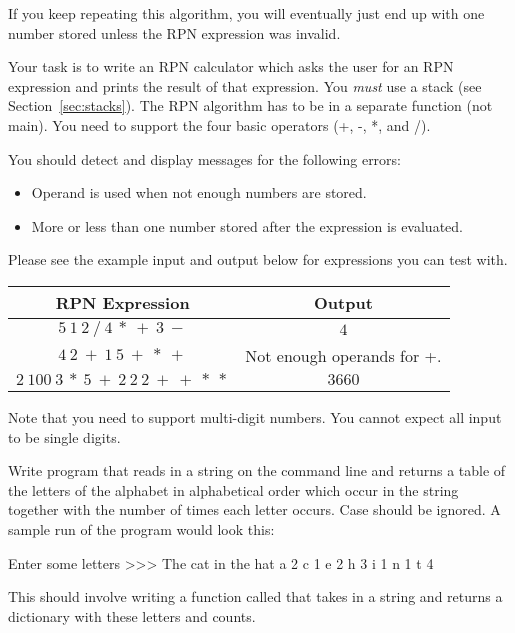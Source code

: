 \documentclass[11pt]{cselabheader}
\begin{document}
\begin{ex}
    If you keep repeating this algorithm, you will eventually just end up with
    one number stored unless the RPN expression was invalid.

    Your task is to write an RPN calculator which asks the user for an RPN
    expression and prints the result of that expression. You \emph{must} use a
    stack (see Section~\ref{sec:stacks}). The RPN algorithm has to be in a
    separate function (not main). You need to support the four basic operators
    (+, -, *, and /).

    You should detect and display messages for the following errors:
    \begin{itemize}
    \item Operand is used when not enough numbers are stored.
    \item More or less than one number stored after the expression is
      evaluated.
    \end{itemize}

    Please see the example input and output below for expressions you can test
    with.

    \begin{center}
    \begin{tabular}{cc}
      \toprule
      RPN Expression & Output\\
      \midrule
      $5~1~2~/~4~*~+~3~-$ & $4$\\
      $4~2~+~1~5~+~*~+$ & Not enough operands for +.\\
      $2~100~3~*~5~+~2~2~2~+~+~*~*$ & $3660$\\
      \bottomrule
    \end{tabular}
    \end{center}
    
    Note that you need to support multi-digit numbers. You cannot expect all
    input to be single digits.

  \end{ex}

\begin{ex}[lettercount.py]
Write program that reads in a string on the command line and returns a table of
the letters of the alphabet in alphabetical order which occur in the string
together with the number of times each letter occurs. Case should be ignored. A
sample run of the program would look this:

\begin{verbatimcode}
Enter some letters >>> The cat in the hat
a 2
c 1
e 2
h 3
i 1
n 1
t 4
\end{verbatimcode}

This should involve writing a function called  that 
takes in a string and returns a dictionary with these letters and counts.
\end{ex}
\end{document}
